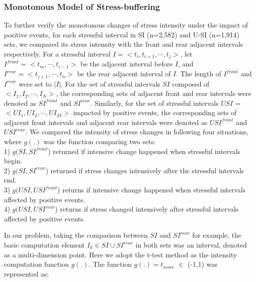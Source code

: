\subsubsection{Monotonous Model of Stress-buffering}
\label{sec:mono}
To further verify the monotonous changes of stress intensity under the impact of positive events,
for each stressful interval in SI (n=2,582) and U-SI (n=1,914) sets,
we compared its stress intensity with the front and rear adjacent intervals respectively.
For a stressful interval $I = <t_i,t_{i+1},\cdots,t_j>$,
let $I^{front} = <t_m,\cdots,t_{i-1}>$ be the adjacent interval before $I$,
and $I^{rear} = <t_{j+1},\cdots,t_n>$ be the rear adjacent interval of $I$.
The length of $I^{front}$ and $I^{rear}$ were set to $|I|$.
For the set of stressful intervals $SI$ composed of $<I_1,I_2,\cdots,I_N>$,
the corresponding sets of adjacent front and rear intervals were denoted as $SI^{front}$ and $SI^{rear}$.
Similarly, for the set of stressful intervals $USI$ = $<UI_1,UI_2,\cdots, UI_M>$ impacted by positive events,
the corresponding sets of adjacent front intervals and adjacent rear intervals were denoted as $USI^{front}$ and $USI^{rear}$.
We compared the intensity of stress changes in following four situations,
where $g(.)$ was the function comparing two sets: \\
1) $g(SI,SI^{front}$) returned if intensive change happened when stressful intervals begin.\\
2) $g(SI,SI^{rear}$) returned if stress changes intensively after the stressful intervals end.\\
3) $g(USI,USI^{front}$) returns if intensive change happened when stressful intervals affected by positive events.\\
4) $g(USI,USI^{rear}$) returns if stress changed intensively after stressful intervals affected by positive events.

In our problem, taking the comparison between $SI$ and $SI^{rear}$ for example,
the basic computation element $I_k \in SI \cup SI^{rear}$ in both sets was an interval, denoted as a multi-dimension point.
Here we adopt the t-test method as the intensity computation function $g(.)$.
The function $g(.) = t_{score}$ $\in$ (-1,1) was represented as:

